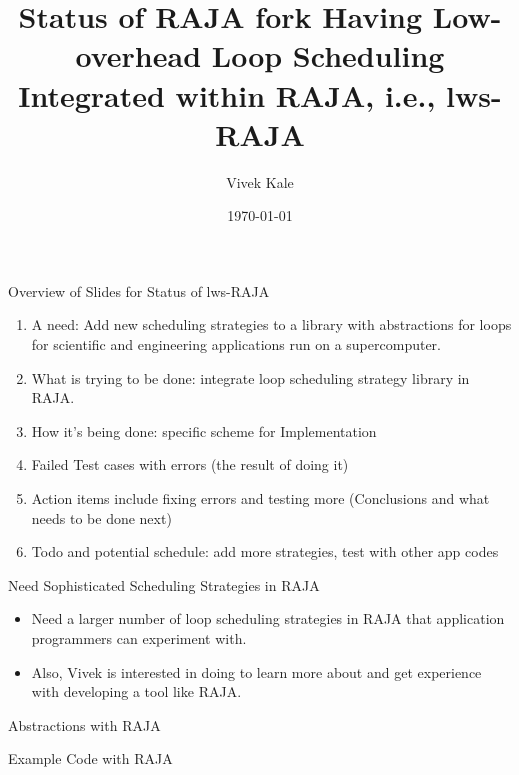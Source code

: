 \documentclass{beamer}
\title{Status of RAJA fork Having Low-overhead Loop Scheduling Integrated within RAJA, i.e., lws-RAJA}
\author{Vivek Kale}
\date{\today}
\begin{document}
 

\begin{frame}
\titlepage
\end{frame}

\begin{frame}[label=ovwlwsRAJAstatus]{Overview of Slides for Status of lws-RAJA}
\begin{enumerate}
\item A need: Add new scheduling strategies to a library with abstractions for loops for scientific and engineering applications run on a supercomputer.
\item What is trying to be done: integrate loop scheduling strategy library in RAJA.
\item How it's being done: specific scheme for Implementation 
\item Failed Test cases with errors (the result of doing it) 
\item Action items include fixing errors and testing more (Conclusions and what needs to be done next)
\item Todo and potential schedule: add more strategies, test with other app codes
\end{enumerate}
\end{frame}

\begin{frame}{Need Sophisticated Scheduling Strategies in RAJA}
\begin{itemize}
\item Need a larger number of loop scheduling strategies in RAJA that application programmers can experiment with.
\item Also, Vivek is interested in doing to learn more about and get experience with developing a tool like RAJA. 
\end{itemize} 
\end{frame}



\begin{frame}{Abstractions with RAJA}
\begin{figure}[ht!] 

\end{figure}
\end{frame}

\begin{frame}{Example Code with RAJA}
\begin{figure}[ht!] 

\end{figure}
\end{frame}
\end{document}
